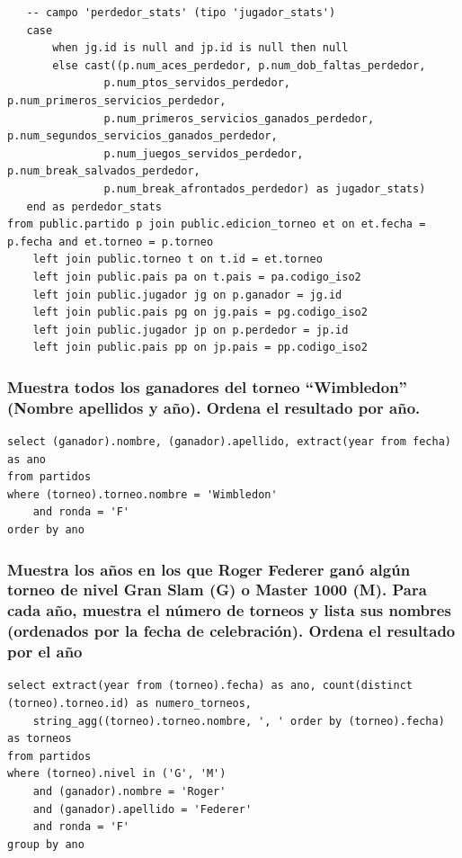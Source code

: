 \documentclass[11pt]{opticajnl}
\begin{document}
\begin{verbatim}
   -- campo 'perdedor_stats' (tipo 'jugador_stats')
   case
       when jg.id is null and jp.id is null then null
       else cast((p.num_aces_perdedor, p.num_dob_faltas_perdedor,
           	   p.num_ptos_servidos_perdedor, p.num_primeros_servicios_perdedor,
           	   p.num_primeros_servicios_ganados_perdedor, p.num_segundos_servicios_ganados_perdedor,
           	   p.num_juegos_servidos_perdedor, p.num_break_salvados_perdedor,
           	   p.num_break_afrontados_perdedor) as jugador_stats)
   end as perdedor_stats
from public.partido p join public.edicion_torneo et on et.fecha = p.fecha and et.torneo = p.torneo 
	left join public.torneo t on t.id = et.torneo
	left join public.pais pa on t.pais = pa.codigo_iso2
	left join public.jugador jg on p.ganador = jg.id
	left join public.pais pg on jg.pais = pg.codigo_iso2
	left join public.jugador jp on p.perdedor = jp.id
	left join public.pais pp on jp.pais = pp.codigo_iso2
\end{verbatim}





\subsubsection{Muestra todos los ganadores del torneo ``Wimbledon'' (Nombre apellidos y año). Ordena el resultado por año.}

\begin{verbatim}
select (ganador).nombre, (ganador).apellido, extract(year from fecha) as ano
from partidos
where (torneo).torneo.nombre = 'Wimbledon'
	and ronda = 'F'
order by ano
\end{verbatim}





\subsubsection{Muestra los años en los que Roger Federer ganó algún torneo de nivel Gran Slam (G) o Master 1000 (M). Para cada año, muestra el número de torneos y lista sus nombres (ordenados por la fecha de celebración). Ordena el resultado por el año}

\begin{verbatim}
select extract(year from (torneo).fecha) as ano, count(distinct (torneo).torneo.id) as numero_torneos, 
	string_agg((torneo).torneo.nombre, ', ' order by (torneo).fecha) as torneos
from partidos
where (torneo).nivel in ('G', 'M')
	and (ganador).nombre = 'Roger'
	and (ganador).apellido = 'Federer'
	and ronda = 'F'
group by ano
\end{verbatim}
\end{document}

